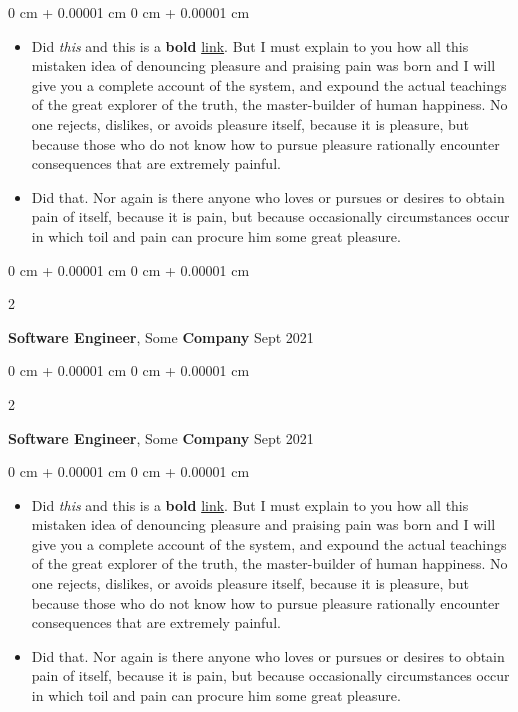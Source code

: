 \documentclass[10pt, letterpaper]{article}
\newenvironment{highlights}{
    \begin{itemize}[
        topsep=0.10 cm,
        parsep=0.10 cm,
        partopsep=0pt,
        itemsep=0pt,
        leftmargin=0 cm + 10pt
    ]
}{
    \end{itemize}
} %
\newenvironment{onecolentry}{
    \begin{adjustwidth}{
        0 cm + 0.00001 cm
    }{
        0 cm + 0.00001 cm
    }
}{
    \end{adjustwidth}
} %
\newenvironment{twocolentry}[2][]{
    \onecolentry
    \def\secondColumn{#2}
    \setcolumnwidth{\fill, 4.5 cm}
    \begin{paracol}{2}
}{
    \switchcolumn \raggedleft \secondColumn
    \end{paracol}
    \endonecolentry
} %
\begin{document}
        \vspace{0.10 cm}
        \begin{onecolentry}
            \begin{highlights}
                \item Did \textit{this} and this is a \textbf{bold} \href{https://example.com}{link}. But I must explain to you how all this mistaken idea of denouncing pleasure and praising pain was born and I will give you a complete account of the system, and expound the actual teachings of the great explorer of the truth, the master-builder of human happiness. No one rejects, dislikes, or avoids pleasure itself, because it is pleasure, but because those who do not know how to pursue pleasure rationally encounter consequences that are extremely painful.
                \item Did that. Nor again is there anyone who loves or pursues or desires to obtain pain of itself, because it is pain, but because occasionally circumstances occur in which toil and pain can procure him some great pleasure.
            \end{highlights}
        \end{onecolentry}


        \vspace{0.2 cm}

        \begin{twocolentry}{
            Sept 2021
        }
            \textbf{Software Engineer}, Some \textbf{Company}\end{twocolentry}



        \vspace{0.2 cm}

        \begin{twocolentry}{
            Sept 2021
        }
            \textbf{Software Engineer}, Some \textbf{Company}\end{twocolentry}

        \vspace{0.10 cm}
        \begin{onecolentry}
            \begin{highlights}
                \item Did \textit{this} and this is a \textbf{bold} \href{https://example.com}{link}. But I must explain to you how all this mistaken idea of denouncing pleasure and praising pain was born and I will give you a complete account of the system, and expound the actual teachings of the great explorer of the truth, the master-builder of human happiness. No one rejects, dislikes, or avoids pleasure itself, because it is pleasure, but because those who do not know how to pursue pleasure rationally encounter consequences that are extremely painful.
                \item Did that. Nor again is there anyone who loves or pursues or desires to obtain pain of itself, because it is pain, but because occasionally circumstances occur in which toil and pain can procure him some great pleasure.
            \end{highlights}
        \end{onecolentry}
\end{document}
